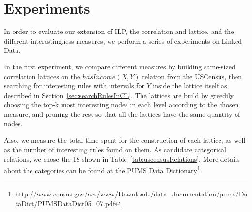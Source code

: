 \chapter{Experiments}
\label{ch:intro}

In order to evaluate our extension of ILP, the correlation and lattice, and the different interestingness measures, we
perform a series of experiments on Linked Data.

In the first experiment, we compare different measures by building same-sized correlation lattices on the
$hasIncome(X,Y)$ relation from the USCensus, then searching for interesting rules with intervals for $Y$ inside the
lattice itself as described in Section~\ref{sec:searchRulesInCL}. The lattices are build by greedily choosing the top-k
most interesting nodes in each level according to the chosen measure, and pruning the rest so that all the lattices have
the same quantity of nodes.

Also, we measure the total time spent for the construction of each lattice, as well as the number of interesting rules
found on them. As candidate categorical relations, we chose the 18 shown in Table~\ref{tab:uscensusRelations}. More
details about the categories can be found at the PUMS
Data
Dictionary\footnote{\url{http://www.census.gov/acs/www/Downloads/data_documentation/pums/DataDict/PUMSDataDict05_07.pdf}
}

